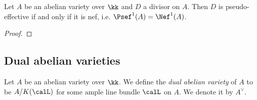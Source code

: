     \begin{corollary}\label{cor:psef_iff_nef_for_abelian_varieties}
        Let \(A\) be an abelian variety over \(\kk\) and \(D\) a divisor on \(A\).
        Then \(D\) is pseudo-effective if and only if it is nef, i.e. \(\Psef^1(A) = \Nef^1(A)\).
    \end{corollary}
    \begin{proof}
    \end{proof}






\subsection{Dual abelian varieties}

    \begin{definition}\label{def:dual_abelian_variety}
        Let \(A\) be an abelian variety over \(\kk\).
        We define the \emph{dual abelian variety} of \(A\) to be \(A/K(\calL)\) for some ample line bundle \(\calL\) on \(A\).
        We denote it by \(A^\vee\).
    \end{definition}


